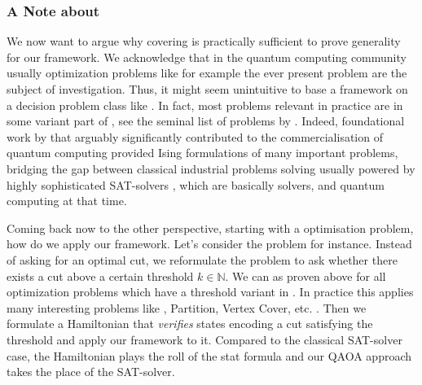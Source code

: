 \subsubsection{A Note about \NP}
We now want to argue why covering \NP is practically sufficient to prove generality for our framework. We acknowledge that in the quantum computing community usually optimization problems like for example the ever present \maxcut problem are the subject of investigation. Thus, it might seem unintuitive to base a framework on a decision problem class like \NP. In fact, most problems relevant in practice are in some variant part of \NP, see the seminal list of \NP problems \cite{Karp1972} by \citeauthor{Karp1972}. Indeed, foundational work by \citeauthor{lucas2014ising}  that arguably significantly contributed to the commercialisation of quantum computing \cite{lucas2014ising} provided Ising formulations of many important \NP problems, bridging the gap between classical industrial problems solving usually powered by highly sophisticated SAT-solvers \cite{heule2024proceedings}, which are basically \NP solvers, and quantum computing at that time. 

Coming back now to the other perspective, starting with a optimisation problem, how do we apply our framework. Let's consider the \maxcut problem for instance. Instead of asking for an optimal cut, we reformulate the problem to ask whether there exists a cut above a certain threshold $k \in \mathds{N}$. We can as proven above for all optimization problems which have a threshold variant in \NP. In practice this applies many interesting problems like \maxcut, Partition, Vertex Cover, etc. \cite{Karp1972}. Then we formulate a Hamiltonian that \emph{verifies} states encoding a cut satisfying the threshold and apply our framework to it. Compared to the classical SAT-solver case, the Hamiltonian plays the roll of the stat formula and our QAOA approach takes the place of the SAT-solver.

